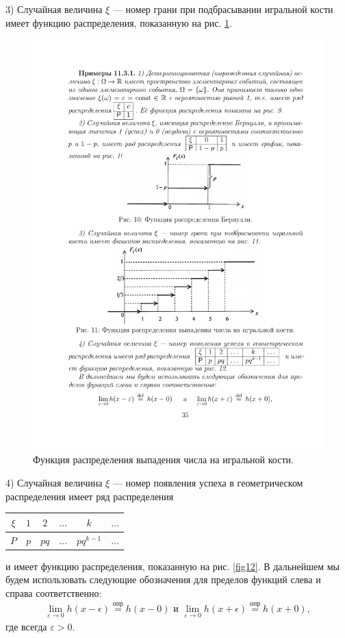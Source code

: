 \begin{example}
3) Случайная величина $\xi$ — номер грани при подбрасывании игральной
кости имеет функцию распределения, показанную на рис. \ref{fig11}.
\begin{figure}[H]
	\centering
	\includegraphics[]{pic/pic11}
	\caption{Функция распределения выпадения числа на игральной кости.}
	\label{fig11}
\end{figure}

4) Случайная величина $\xi$ — номер появления успеха в геометрическом
распределения имеет ряд распределения 
\begin{tabular}{|c|c|c|c|c|c|}
\hline
$\xi$ & $1$ & $2$ & $\dots$ & $k$ & $\dots$\\ \hline
$P$ & $p$ & $pq$ & $\dots$ & $pq^{k-1}$ & $\dots$\\ \hline
\end{tabular}
и имеет функцию распределения, показанную на рис. \ref{fig12}.
В дальнейшем мы будем использовать следующие обозначения для пределов функций слева и справа соответственно:
\begin{gather*}
	\lim_{\varepsilon\to 0}h(x-\epsilon)\stackrel{\text{опр}}{=}h(x-0) \,\, \text{и} \,\,
	\lim_{\varepsilon\to 0}h(x+\epsilon)\stackrel{\text{опр}}{=}h(x+0),
\end{gather*}
где всегда $\varepsilon >0$.


\end{example}
